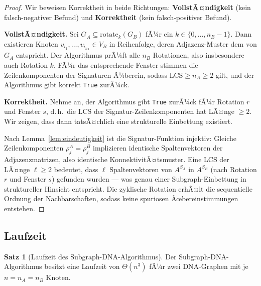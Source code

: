 ﻿\documentclass[a4paper,12pt]{article}
\theoremstyle{definition}
\newtheorem{satz}{Satz}
\begin{document}
\begin{proof}
    Wir beweisen Korrektheit in beide Richtungen: \textbf{VollstÃ¤ndigkeit}
    (kein falsch-negativer Befund) und \textbf{Korrektheit} (kein falsch-positiver
    Befund).

    \textbf{VollstÃ¤ndigkeit.}
    Sei $G_A \subseteq \mathrm{rotate}_k(G_B)$ fÃ¼r ein $k \in \{0, \ldots, n_B-1\}$.
    Dann existieren Knoten $v_{i_1}, \ldots, v_{i_{n_A}} \in V_B$ in Reihenfolge,
    deren Adjazenz-Muster dem von $G_A$ entspricht. Der Algorithmus prÃ¼ft alle
    $n_B$ Rotationen, also insbesondere auch Rotation $k$. FÃ¼r das entsprechende
    Fenster stimmen die Zeilenkomponenten der Signaturen Ã¼berein, sodass
    $\mathrm{LCS} \geq n_A \geq 2$ gilt, und der Algorithmus gibt korrekt
    \texttt{True} zurÃ¼ck.

    \textbf{Korrektheit.}
    Nehme an, der Algorithmus gibt \texttt{True} zurÃ¼ck fÃ¼r Rotation $r$ und
    Fenster $s$, d.\,h.\ die LCS der Signatur-Zeilenkomponenten hat LÃ¤nge
    $\geq 2$. Wir zeigen, dass dann tatsÃ¤chlich eine strukturelle Einbettung
    existiert.

    Nach Lemma~\ref{lem:eindeutigkeit} ist die Signatur-Funktion injektiv:
    Gleiche Zeilenkomponenten $\rho_j^A = \rho_j^B$ implizieren identische
    Spaltenvektoren der Adjazenzmatrizen, also identische KonnektivitÃ¤tsmuster.
    Eine LCS der LÃ¤nge $\ell \geq 2$ bedeutet, dass $\ell$ Spaltenvektoren
    von $A^{S_A}$ in $A^{S_B}$ (nach Rotation $r$ und Fenster $s$) gefunden
    wurden --- was genau einer Subgraph-Einbettung in struktureller Hinsicht
    entspricht. Die zyklische Rotation erhÃ¤lt die sequentielle Ordnung der
    Nachbarschaften, sodass keine spuriosen Ãœbereinstimmungen entstehen. 
\end{proof}

\subsection{Laufzeit}

\begin{satz}[Laufzeit des Subgraph-DNA-Algorithmus]
    \label{satz:laufzeit}
    Der Subgraph-DNA-Algorithmus besitzt eine Laufzeit von $\Theta(n^3)$ fÃ¼r zwei
    DNA-Graphen mit je $n = n_A = n_B$ Knoten.
\end{satz}
\end{document}
